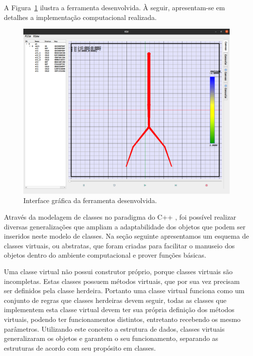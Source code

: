 \documentclass[a4paper,12pt]{monografia}
\theoremstyle{plain}
\theoremstyle{definition}
\theoremstyle{remark}
\begin{document}
A Figura~\ref{fig1:gui} ilustra a ferramenta desenvolvida. À seguir, apresentam-se em detalhes a implementação computacional realizada.

\begin{figure}[!htbp]
	\centering
	\includegraphics[scale=0.25]{Figures/IGU.png}
	\caption{Interface gráfica da ferramenta desenvolvida.}
	\label{fig1:gui}
\end{figure}

Através da modelagem de classes no paradigma do C++ \cite{AlanParker}, foi possível realizar diversas generalizações que ampliam a adaptabilidade dos objetos que podem ser inseridos neste modelo de classes. Na seção seguinte apresentamos um esquema de classes virtuais, ou abstratas, que foram criadas para facilitar o manuseio dos objetos dentro do ambiente computacional e prover funções básicas. 

Uma classe virtual não possui construtor próprio, porque classes virtuais são incompletas. Estas classes possuem métodos virtuais, que por sua vez precisam ser definidos pela classe herdeira. Portanto uma classe virtual funciona como um conjunto de regras que classes herdeiras devem seguir, todas as classes que implementem esta classe virtual devem ter sua própria definição dos métodos virtuais, podendo ter funcionamentos distintos, entretanto recebendo os mesmo parâmetros.  Utilizando este conceito a estrutura de dados, classes virtuais generalizaram os objetos e garantem o seu funcionamento, separando as estruturas de acordo com seu propósito em classes.
\end{document}
